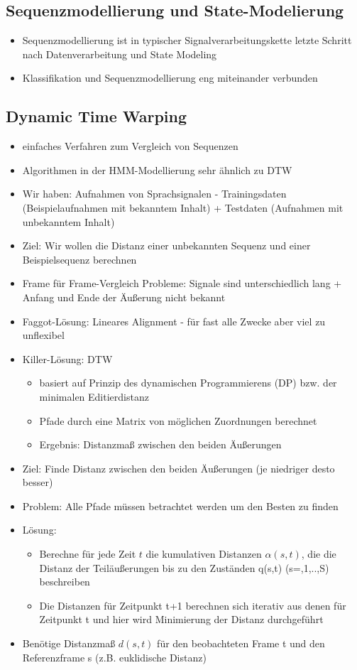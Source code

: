 \documentclass[a4paper,10pt,oneside]{article}
\begin{document}
\subsection{Sequenzmodellierung und State-Modelierung}
	\begin{itemize}
		\item Sequenzmodellierung ist in typischer Signalverarbeitungskette letzte Schritt nach Datenverarbeitung und State Modeling 
		\item Klassifikation und Sequenzmodellierung eng miteinander verbunden
	\end{itemize}

\subsection{Dynamic Time Warping}
	\begin{itemize}
		\item einfaches Verfahren zum Vergleich von Sequenzen
		\item Algorithmen in der HMM-Modellierung sehr ähnlich zu DTW
		\item Wir haben: Aufnahmen von Sprachsignalen - Trainingsdaten (Beispielaufnahmen mit bekanntem Inhalt) + Testdaten (Aufnahmen mit unbekanntem Inhalt)
		\item Ziel: Wir wollen die Distanz einer unbekannten Sequenz und einer Beispielsequenz berechnen
		\item Frame für Frame-Vergleich Probleme: Signale sind unterschiedlich lang + Anfang und Ende der Äußerung nicht bekannt
		\item Faggot-Lösung: Lineares Alignment - für fast alle Zwecke aber viel zu unflexibel
		\item Killer-Lösung: DTW
				\begin{itemize}	
					\item basiert auf Prinzip des dynamischen Programmierens (DP) bzw. der minimalen Editierdistanz
					\item Pfade durch eine Matrix von möglichen Zuordnungen berechnet
					\item Ergebnis: Distanzmaß zwischen den beiden Äußerungen
				\end{itemize}
	
		\item Ziel: Finde Distanz zwischen den beiden Äußerungen (je niedriger desto besser)
		\item Problem: Alle Pfade müssen betrachtet werden um den Besten zu finden
		\item Lösung:
				\begin{itemize}
					\item Berechne für jede Zeit $t$ die kumulativen Distanzen $\alpha(s,t)$, die die Distanz der Teiläußerungen bis zu den Zuständen q(s,t) (s=,1,..,S)  beschreiben
					\item Die Distanzen für Zeitpunkt t+1 berechnen sich iterativ aus denen für Zeitpunkt t und hier wird Minimierung der Distanz durchgeführt
				\end{itemize}
					\item Benötige Distanzmaß $d(s,t)$ für den beobachteten Frame t und den Referenzframe s (z.B. euklidische Distanz)
 		\end{itemize}
\end{document}
